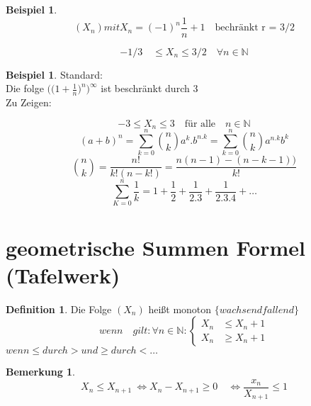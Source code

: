 \documentclass[a4paper,12pt,leqno]{report}
\theoremstyle{plain} %
\theoremstyle{definition} %
\newtheorem{remark}[theorem]{Bemerkung}
\newtheorem{definition}[theorem]{Definition}
\newtheorem{example}[theorem]{Beispiel}
\begin{document}
\begin{example}
	\[  (X_n) mit X_n = (-1)^n \frac{1}{n}+1 \quad \text{bechränkt r = 3/2}\]

	\[-1/3 \quad \leq X_n \leq 3/2 \quad \forall n \in \mathbb{N} \]
\end{example}
\vfil
\vfil
\begin{example}{Standard:}\\

{Die folge}
$ \bigg(\big(1 + \frac{1}{n} \big)^n \bigg)^\infty$
	 {ist beschränkt durch 3}\\

Zu Zeigen:

\[ -3 \leq X_n \leq 3 \quad \text{für alle} \quad n \in \mathbb{N} \]
\[ { (a+b)^n = \sum_{k=0}^{n} \binom{n}{k} a^k . b^{n .k} = \sum_{k=0}^{n} \binom{n}{k} a^{n.k} b^k }  \]
	\[  \binom{n}{k} = \frac{n!}{k!(n-k!)} =  \frac{n(n-1) -(n-k-1))}{k!} \]
	\[  \sum_{K=0}^{n} \frac{1}{k} = 1+ \frac{1}{2} + \frac{1}{2.3} + \frac{1}{2.3.4} + \dots \]
\end{example}


\section{geometrische Summen Formel (Tafelwerk)}
\begin{definition}

	Die Folge $(X_n)$ heißt monoton $\Big\{ wachsend fallend \Big\}$
	\[ wenn \quad gilt: \forall n \in \mathbb{N}:
	\left\{
	\begin{array}{ll}
	X_n  & \leq X_n +1 \\
	X_n  & \geq X_n+1
	\end{array}
	\right. \]
	$ wenn \leq durch > und \geq durch < \dots  $
\end{definition}
\begin{remark}
\[ X_n \leq X_{n+1} \ \Leftrightarrow  X_n - X_{n+1} \geq 0 \quad \Leftrightarrow  \frac{x_n}{X_{n+1}} \leq 1 \]
\end{remark}
\end{document}
